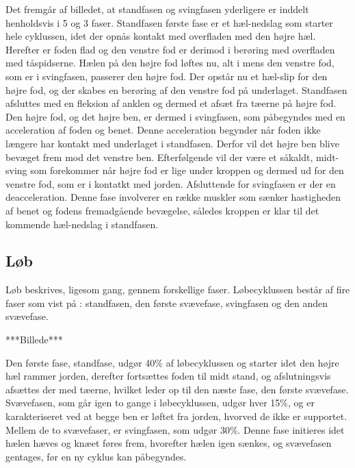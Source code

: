 Det fremgår af billedet, at standfasen og svingfasen yderligere er inddelt henholdsvis i 5 og 3 faser. \newline
Standfasen første fase er et hæl-nedslag som starter hele cyklussen, idet der opnås kontakt med overfladen med den højre hæl. Herefter er foden flad og den venstre fod er derimod i berøring med overfladen med tåspidserne. Hælen på den højre fod løftes nu, alt i mens den venstre fod, som er i svingfasen, passerer den højre fod. Der opstår nu et hæl-slip for den højre fod, og der skabes en berøring af den venstre fod på underlaget. Standfasen afsluttes med en fleksion af anklen og dermed et afsæt fra tæerne på højre fod. \newline
Den højre fod, og det højre ben, er dermed i svingfasen, som påbegyndes med en acceleration af foden og benet. Denne acceleration begynder når foden ikke længere har kontakt med underlaget i standfasen. Derfor vil det højre ben blive bevæget frem mod det venstre ben. Efterfølgende vil der være et såkaldt, midt-sving som forekommer når højre fod er lige under kroppen og dermed ud for den venstre fod, som er i kontatkt med jorden. Afsluttende for svingfasen er der en deacceleration. Denne fase involverer en række muskler som sænker hastigheden af benet og fodens fremadgående bevægelse, således kroppen er klar til det kommende hæl-nedslag i standfasen.
	





\subsection{Løb}
Løb beskrives, ligesom gang, gennem forskellige faser. 
Løbecyklussen består af fire faser som vist på : standfasen, den første svævefase, svingfasen og den anden svævefase. \citep{Adelaar1986}

***Billede*** \label{fig:loebecyklus} \citep{Adelaar1986}

Den første fase, standfase, udgør 40\% af løbecyklussen og starter idet den højre hæl rammer jorden, derefter fortsættes foden til midt stand, og afslutningsvis afsættes der med tæerne, hvilket leder op til den næste fase, den første svævefase. Svævefasen, som går igen to gange i løbecyklussen, udgør hver 15\%, og er karakteriseret ved at begge ben er løftet fra jorden, hvorved de ikke er supportet. Mellem de to svævefaser, er svingfasen, som udgør 30\%. Denne fase initieres idet hælen hæves og knæet føres frem, hvorefter hælen igen sænkes, og svævefasen gentages, før en ny cyklus kan påbegyndes. \citep{Adelaar1986,Novacheck1998}

